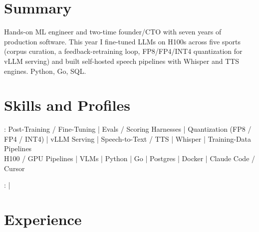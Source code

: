 \documentclass[print]{jack-resume}
\begin{document}
\pagecolor{darkmodeBackground}


\begin{minipage}[t][1cm][t]{.03\textwidth}
    \hfill
\end{minipage}

\section{Summary}
Hands-on ML engineer and two-time founder/CTO with seven years of production software. This year I fine-tuned LLMs on H100s across five sports (corpus curation, a feedback-retraining loop, FP8/FP4/INT4 quantization for vLLM serving) and built self-hosted speech pipelines with Whisper and TTS engines. Python, Go, SQL.
\sectionsep

\section{Skills and Profiles}
:
Post-Training / Fine-Tuning \hfill | \hfill
Evals / Scoring Harnesses \hfill | \hfill
Quantization (FP8 / FP4 / INT4) \hfill | \hfill
vLLM Serving \hfill | \hfill
Speech-to-Text / TTS \hfill | \hfill
Whisper \hfill | \hfill
Training-Data Pipelines \\
\hspace{1.0cm} H100 / GPU Pipelines \hfill | \hfill
VLMs \hfill | \hfill
Python \hfill | \hfill
Go \hfill | \hfill
Postgres \hfill | \hfill
Docker \hfill | \hfill
Claude Code / Cursor \\

\raggedright{
    :
      \href{https://www.linkedin.com/in/jack-sturtevant/}{ \ExternalLink} |
     \href{https://github.com/jacksturt}{ \ExternalLink}}

\section{Experience}
\end{document}
